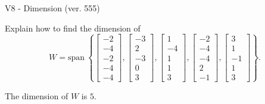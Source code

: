 \begin{exercise}
  \begin{exerciseTitle}V8 - Dimension (ver. 555)\end{exerciseTitle}
  \begin{exerciseStatement}
    Explain how to find the dimension of 
\[W=\mathrm{span}\ \left\{\left[\begin{array}{r}
-2 \\
-4 \\
-2 \\
-4 \\
-4
\end{array}\right] , \left[\begin{array}{r}
-3 \\
2 \\
-3 \\
0 \\
3
\end{array}\right] , \left[\begin{array}{r}
1 \\
-4 \\
1 \\
1 \\
3
\end{array}\right] , \left[\begin{array}{r}
-2 \\
-4 \\
-4 \\
2 \\
-1
\end{array}\right] , \left[\begin{array}{r}
3 \\
1 \\
-1 \\
1 \\
3
\end{array}\right]\right\}.\]



  \end{exerciseStatement}
  \begin{exerciseAnswer}
   The dimension of \(W\) is  \(5\).
  


  \end{exerciseAnswer}
\end{exercise}